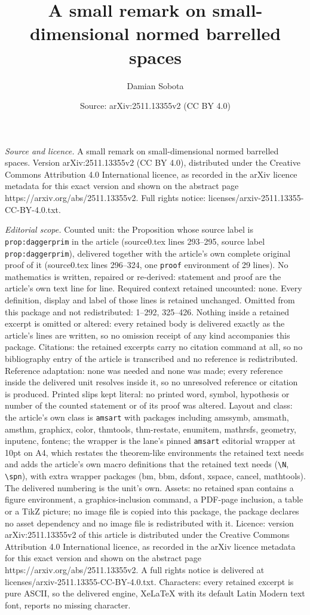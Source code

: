 \documentclass[10pt,a4paper]{amsart}
\title[A small remark on small-dimensional normed barrelled spaces]{A small remark on small-dimensional normed barrelled spaces}
\author{Damian Sobota}
\date{Source: arXiv:2511.13355v2 (CC BY 4.0)}
\begin{document}
\maketitle

\noindent\emph{Source and licence.} A small remark on small-dimensional normed barrelled spaces. Version arXiv:2511.13355v2 (CC BY 4.0), distributed under the Creative Commons Attribution 4.0 International licence, as recorded in the arXiv licence metadata for this exact version and shown on the abstract page https://arxiv.org/abs/2511.13355v2. Full rights notice: licenses/arxiv-2511.13355-CC-BY-4.0.txt.\par\smallskip

\noindent\textit{Editorial scope.} Counted unit: the Proposition whose source label is \texttt{prop:daggerprim} in the article (source0.tex lines 293--295, source label \texttt{prop:daggerprim}), delivered together with the article's own complete original proof of it (source0.tex lines 296--324, one \texttt{proof} environment of 29 lines). No mathematics is written, repaired or re-derived: statement and proof are the article's own text line for line. Required context retained uncounted: none. Every definition, display and label of those lines is retained unchanged. Omitted from this package and not redistributed: 1--292, 325--426. Nothing inside a retained excerpt is omitted or altered: every retained body is delivered exactly as the article's lines are written, so no omission receipt of any kind accompanies this package. Citations: the retained excerpts carry no citation command at all, so no bibliography entry of the article is transcribed and no reference is redistributed. Reference adaptation: none was needed and none was made; every reference inside the delivered unit resolves inside it, so no unresolved reference or citation is produced. Printed slips kept literal: no printed word, symbol, hypothesis or number of the counted statement or of its proof was altered. Layout and class: the article's own class is \texttt{amsart} with packages including amssymb, amsmath, amsthm, graphicx, color, thmtools, thm-restate, enumitem, mathrsfs, geometry, inputenc, fontenc; the wrapper is the lane's pinned \texttt{amsart} editorial wrapper at 10pt on A4, which restates the theorem-like environments the retained text needs and adds the article's own macro definitions that the retained text needs (\texttt{\textbackslash N}, \texttt{\textbackslash spn}), with extra wrapper packages (bm, bbm, dsfont, xspace, cancel, mathtools). The delivered numbering is the unit's own. Assets: no retained span contains a figure environment, a graphics-inclusion command, a PDF-page inclusion, a table or a TikZ picture; no image file is copied into this package, the package declares no asset dependency and no image file is redistributed with it. Licence: version arXiv:2511.13355v2 of this article is distributed under the Creative Commons Attribution 4.0 International licence, as recorded in the arXiv licence metadata for this exact version and shown on the abstract page https://arxiv.org/abs/2511.13355v2. A full rights notice is delivered at licenses/arxiv-2511.13355-CC-BY-4.0.txt. Characters: every retained excerpt is pure ASCII, so the delivered engine, XeLaTeX with its default Latin Modern text font, reports no missing character.
\end{document}
